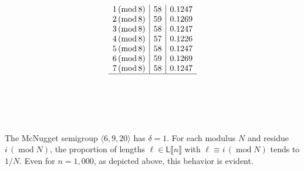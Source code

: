 \documentclass[10pt,reqno]{amsart}
\newcommand{\Le}{\mathsf{L}}
\providecommand{\multi}[1]{\llbracket #1 \rrbracket}
\newcommand{\0}{\color{lightgray}0}
\renewcommand{\pmod}[1]{\,(\operatorname{mod} #1)}
\renewcommand\>{\rangle}
\newcommand\<{\langle}
\theoremstyle{plain}
\theoremstyle{definition}
\begin{document}
\begin{table}
\begin{equation*}
\begin{array}{c@{}c|c|c}
1 \pmod{ 8 } &&   58 &  0.1247 \\
2 \pmod{ 8 } &&   59 &   0.1269\\
3 \pmod{ 8 } &&   58 &   0.1247\\
4 \pmod{ 8 } &&   57 &   0.1226\\
5 \pmod{ 8 } &&   58 &   0.1247\\
6 \pmod{ 8 } &&   59 &   0.1269\\
7 \pmod{ 8 } &&   58 &   0.1247\\
\hline
\\
\\
\\
\\
\\
\end{array}
\end{equation*}
\caption{The McNugget semigroup $\<6,9,20\>$ has $\delta = 1$.
For each modulus $N$ and residue $i \pmod{N}$, the proportion of lengths $\ell \in \Le\multi{n}$ with $\ell \equiv i \pmod{N}$ tends to $1/N$.  Even for $n=1{,}000$, as depicted above, this behavior is evident.}
\label{Table:McNugget}
\end{table}
\end{document}
